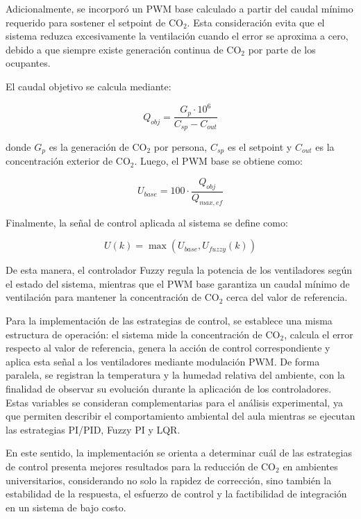 Adicionalmente, se incorporó un PWM base calculado a partir del caudal mínimo requerido para sostener el setpoint de CO$_2$. Esta consideración evita que el sistema reduzca excesivamente la ventilación cuando el error se aproxima a cero, debido a que siempre existe generación continua de CO$_2$ por parte de los ocupantes.

El caudal objetivo se calcula mediante:

\begin{equation}
    Q_{obj}=\frac{G_p\cdot 10^6}{C_{sp}-C_{out}}
\end{equation}

donde \(G_p\) es la generación de CO$_2$ por persona, \(C_{sp}\) es el setpoint y \(C_{out}\) es la concentración exterior de CO$_2$. Luego, el PWM base se obtiene como:

\begin{equation}
    U_{base}=100\cdot\frac{Q_{obj}}{Q_{max,ef}}
\end{equation}

Finalmente, la señal de control aplicada al sistema se define como:

\begin{equation}
    U(k)=\max\left(U_{base},U_{fuzzy}(k)\right)
\end{equation}

De esta manera, el controlador Fuzzy regula la potencia de los ventiladores según el estado del sistema, mientras que el PWM base garantiza un caudal mínimo de ventilación para mantener la concentración de CO$_2$ cerca del valor de referencia.






Para la implementación de las estrategias de control, se establece una misma estructura de operación: el sistema mide la concentración de CO$_2$, calcula el error respecto al valor de referencia, genera la acción de control correspondiente y aplica esta señal a los ventiladores mediante modulación PWM. De forma paralela, se registran la temperatura y la humedad relativa del ambiente, con la finalidad de observar su evolución durante la aplicación de los controladores. Estas variables se consideran complementarias para el análisis experimental, ya que permiten describir el comportamiento ambiental del aula mientras se ejecutan las estrategias PI/PID, Fuzzy PI y LQR.

En este sentido, la implementación se orienta a determinar cuál de las estrategias de control presenta mejores resultados para la reducción de CO\(_2\) en ambientes universitarios, considerando no solo la rapidez de corrección, sino también la estabilidad de la respuesta, el esfuerzo de control y la factibilidad de integración en un sistema de bajo costo.

